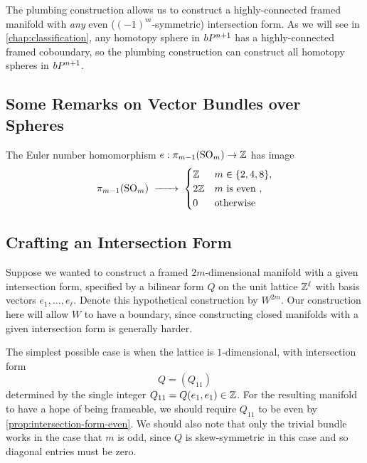 The plumbing construction allows us to construct a highly-connected framed manifold with \emph{any} even ($(-1)^m$-symmetric) intersection form. As we will see in \cref{chap:classification}, any homotopy sphere in $bP^{n+1}$ has a highly-connected framed coboundary, so the plumbing construction can construct all homotopy spheres in $bP^{n+1}$.

\subsection{Some Remarks on Vector Bundles over Spheres}

\begin{theorem}\label{thm:possible-euler-numbers-over-spheres}
	The Euler number homomorphism $e : \pi_{m-1}(\mathrm{SO}_m) \to \mathbb{Z}$ has image
	\[
		\pi_{m-1}(\SO_m) \lkxto
		\begin{cases}
			\Z  & m\in\{2,4,8\},       \\
			2\Z & m\textrm{ is even }, \\
			0   & \textrm{otherwise}\end{cases}
	\]
\end{theorem}

\subsection{Crafting an Intersection Form}

Suppose we wanted to construct a framed $2m$-dimensional manifold with a given intersection form, specified by a bilinear form $Q$ on the unit lattice $\mathbb{Z}^\ell$ with basis vectors $e_1,\ldots, e_\ell$. Denote this hypothetical construction by $W^{2m}$. Our construction here will allow $W$ to have a boundary, since constructing closed manifolds with a given intersection form is generally harder.

The simplest possible case is when the lattice is $1$-dimensional, with intersection form
\[
	Q =  (Q_{11})
\]
determined by the single integer $Q_{11}=Q(e_1,e_1)\in \mathbb{Z}$.
For the resulting manifold to have a hope of being frameable, we should require $Q_{11}$ to be even by \cref{prop:intersection-form-even}. We should also note that only the trivial bundle works in the case that $m$ is odd, since $Q$ is skew-symmetric in this case and so diagonal entries must be zero.

